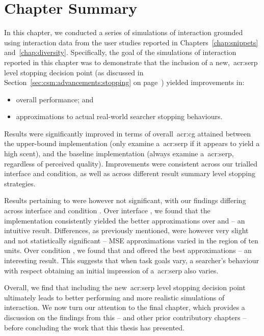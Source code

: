 \section{Chapter Summary}
In this chapter, we conducted a series of simulations of interaction grounded using interaction data from the user studies reported in Chapters~\ref{chap:snippets} and~\ref{chap:diversity}. Specifically, the goal of the simulations of interaction reported in this chapter was to demonstrate that the inclusion of a new,~\gls{acr:serp} level stopping decision point (as discussed in Section~\ref{sec:csm:advancements:stopping} on page~\pageref{sec:csm:advancements:stopping}) yielded improvements in:

\begin{itemize}
    \item{ overall performance; and}
    \item{ approximations to actual real-world searcher stopping behaviours.}
\end{itemize}

Results were significantly improved in terms of overall~\gls{acr:cg} attained between the upper-bound  implementation (only examine a~\gls{acr:serp} if it appears to yield a high scent), and the baseline  implementation (always examine a~\gls{acr:serp}, regardless of perceived quality). Improvements were consistent across our trialled interface and condition, as well as across different result summary level stopping strategies.

Results pertaining to  were however not significant, with our findings differing across interface  and condition . Over interface , we found that the  implementation consistently yielded the better approximations over  and  -- an intuitive result. Differences, as previously mentioned, were however very slight and not statistically significant -- MSE approximations varied in the region of ten units. Over condition , we found that  and  offered the best approximations -- an interesting result. This suggests that when task goals vary, a searcher's behaviour with respect obtaining an initial impression of a~\gls{acr:serp} also varies.

Overall, we find that including the new~\gls{acr:serp} level stopping decision point ultimately leads to better performing and more realistic simulations of interaction. We now turn our attention to the final chapter, which provides a discussion on the findings from this -- and other prior contributory chapters -- before concluding the work that this thesis has presented.

\newpage
\thispagestyle{empty}
\mbox{}
